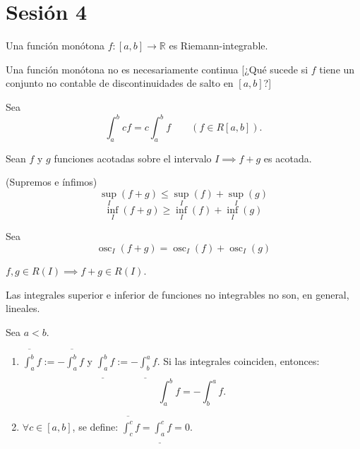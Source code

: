 \section{Sesión 4}

\begin{teorema}
	Una función monótona $f:[a,b]\to\mathbb{R}$ es Riemann-integrable. 
\end{teorema}

\begin{nota}
	Una función monótona no es necesariamente continua [¿Qué sucede si $f$ tiene un conjunto no contable de discontinuidades de salto en $[a,b]$?]
\end{nota}

\begin{prop}
	Sea 
	$$\int_a^b c f=c\int_a^b f\qquad (f\in R[a,b]).$$
\end{prop}


\begin{nota}
	Sean $f$ y $g$ funciones acotadas sobre el intervalo $I\implies f+g$ es acotada. 
\end{nota}

\begin{prop}(Supremos e ínfimos)
	$$\sup_I (f+g)\leq \sup_I(f)+\sup_I (g)$$
	$$\inf_I (f+g)\geq \inf_I(f)+\inf_I (g)$$
\end{prop}

\begin{prop} Sea
	$$\operatorname{osc}_I (f+g)=\operatorname{osc}_I (f)+\operatorname{osc}_I (g)$$
\end{prop}

\begin{prop}
	$f,g\in R(I)\implies f+g\in R(I)$. 
\end{prop}

\begin{nota}
	Las integrales superior e inferior de funciones no integrables no son, en general, lineales.
\end{nota}


\begin{definicion}
	Sea $a<b$. 
	\begin{enumerate}
		\item $\overline{\int_a^b}f:=-\overline{\int_a^b}f$ y $\underline{\int_a^b} f :=-\underline{\int_b^a}f$. Si las integrales coinciden, entonces: 
		$$\int_a^b f=-\int_b^a f.$$
		\item $\forall c\in [a,b]$, se define: $\overline{\int_c^c}f=\underline{\int_a^c}f=0.$
	\end{enumerate}
\end{definicion}

